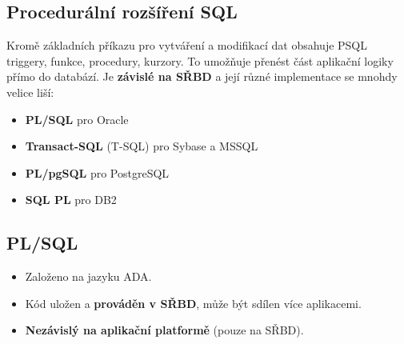 \subsection{Procedurální rozšíření SQL}
Kromě základních příkazu pro vytváření a modifikací dat obsahuje PSQL triggery, funkce, procedury, kurzory. To umožňuje přenést část aplikační logiky přímo do databází. Je \textbf{závislé na SŘBD} a její různé implementace se mnohdy velice liší:
\begin{itemize}
\item \textbf{PL/SQL} pro Oracle
\item \textbf{Transact-SQL} (T-SQL) pro Sybase a MSSQL
\item \textbf{PL/pgSQL} pro PostgreSQL
\item \textbf{SQL PL} pro DB2
\end{itemize}

\subsection{PL/SQL}
\begin{itemize}
\item Založeno na jazyku ADA.
\item Kód uložen a \textbf{prováděn v SŘBD}, může být sdílen více aplikacemi.
\item \textbf{Nezávislý na aplikační platformě} (pouze na SŘBD).
\end{itemize}

